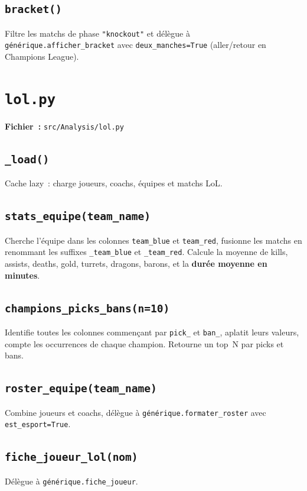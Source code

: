 \documentclass[12pt,a4paper]{article}
\begin{document}
\subsection{\texttt{bracket()}}
Filtre les matchs de phase \texttt{"knockout"} et délègue à
\texttt{générique.afficher\_bracket} avec \texttt{deux\_manches=True}
(aller/retour en Champions League).

\section{\texttt{lol.py}}

\textbf{Fichier~:} \texttt{src/Analysis/lol.py}

\subsection{\texttt{\_load()}}
Cache lazy~: charge joueurs, coachs, équipes et matchs LoL.

\subsection{\texttt{stats\_equipe(team\_name)}}
Cherche l'équipe dans les colonnes \texttt{team\_blue} et \texttt{team\_red},
fusionne les matchs en renommant les suffixes \texttt{\_team\_blue} et
\texttt{\_team\_red}. Calcule la moyenne de kills, assists, deaths, gold,
turrets, dragons, barons, et la \textbf{durée moyenne en minutes}.

\subsection{\texttt{champions\_picks\_bans(n=10)}}
Identifie toutes les colonnes commençant par \texttt{pick\_} et \texttt{ban\_},
aplatit leurs valeurs, compte les occurrences de chaque champion. Retourne
un top~N par picks et bans.

\subsection{\texttt{roster\_equipe(team\_name)}}
Combine joueurs et coachs, délègue à \texttt{générique.formater\_roster}
avec \texttt{est\_esport=True}.

\subsection{\texttt{fiche\_joueur\_lol(nom)}}
Délègue à \texttt{générique.fiche\_joueur}.
\end{document}

